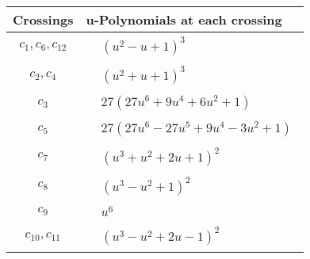 \documentclass[1p]{elsarticle_modified}
\theoremstyle{definition}
\begin{document}
\begin{tabular}{m{50pt}|m{274pt}}
Crossings & \hspace{64pt}u-Polynomials at each crossing \\
\hline $$\begin{aligned}c_{1},c_{6},c_{12}\end{aligned}$$&$\begin{aligned}
&(u^2- u+1)^3
\end{aligned}$\\
\hline $$\begin{aligned}c_{2},c_{4}\end{aligned}$$&$\begin{aligned}
&(u^2+u+1)^3
\end{aligned}$\\
\hline $$\begin{aligned}c_{3}\end{aligned}$$&$\begin{aligned}
&27(27 u^6+9 u^4+6 u^2+1)
\end{aligned}$\\
\hline $$\begin{aligned}c_{5}\end{aligned}$$&$\begin{aligned}
&27(27 u^6-27 u^5+9 u^4-3 u^2+1)
\end{aligned}$\\
\hline $$\begin{aligned}c_{7}\end{aligned}$$&$\begin{aligned}
&(u^3+u^2+2 u+1)^2
\end{aligned}$\\
\hline $$\begin{aligned}c_{8}\end{aligned}$$&$\begin{aligned}
&(u^3- u^2+1)^2
\end{aligned}$\\
\hline $$\begin{aligned}c_{9}\end{aligned}$$&$\begin{aligned}
&u^6
\end{aligned}$\\
\hline $$\begin{aligned}c_{10},c_{11}\end{aligned}$$&$\begin{aligned}
&(u^3- u^2+2 u-1)^2
\end{aligned}$\\
\hline
\end{tabular}\\~\\
\end{document}
